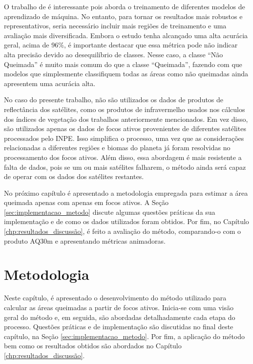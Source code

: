 \documentclass[cic,tc]{iiufrgs}
\begin{document}
O trabalho de \citet{dosclassificaccao} é interessante pois aborda o treinamento de diferentes modelos de aprendizado de máquina. No entanto, para tornar os resultados mais robustos e representativos, seria necessário incluir mais regiões de treinamento e uma avaliação mais diversificada. Embora o estudo tenha alcançado uma alta acurácia geral, acima de 96\%, é importante destacar que essa métrica pode não indicar alta precisão devido ao desequilíbrio de classes. Nesse caso, a classe ``Não Queimada'' é muito mais comum do que a classe ``Queimada'', fazendo com que modelos que simplesmente classifiquem todas as áreas como não queimadas ainda apresentem uma acurácia alta.

No caso do presente trabalho, não são utilizados os dados de produtos de reflectância dos satélites, como os produtos de infravermelho usados nos cálculos dos índices de vegetação dos trabalhos anteriormente mencionados. Em vez disso, são utilizados apenas os dados de focos ativos provenientes de diferentes satélites processados pelo INPE. Isso simplifica o processo, uma vez que as considerações relacionadas a diferentes regiões e biomas do planeta já foram resolvidas no processamento dos focos ativos. Além disso, essa abordagem é mais resistente a falta de dados, pois se um ou mais satélites falharem, o método ainda será capaz de operar com os dados dos satélites restantes. 

No próximo capítulo é apresentado a metodologia empregada para estimar a área queimada apenas com apenas em focos ativos. A Seção \ref{sec:implementacao_metodo} discute algumas questões práticas da sua implementação e de como os dados utilizados foram obtidos. Por fim, no Capítulo \ref{chp:resultados_discussão}, é feito a avaliação do método, comparando-o com o produto AQ30m e apresentando métricas animadoras.




\chapter{Metodologia}
\label{chp:metodologia}

Neste capítulo, é apresentado o desenvolvimento do método utilizado para calcular as áreas queimadas a partir de focos ativos. Inicia-se com uma visão geral do método e, em seguida, são abordadas detalhadamente cada etapa do processo. Questões práticas e de implementação são discutidas no final deste capítulo, na Seção \ref{sec:implementacao_metodo}. Por fim, a aplicação do método bem como os resultados obtidos são abordados no Capítulo \ref{chp:resultados_discussão}.
\end{document}
